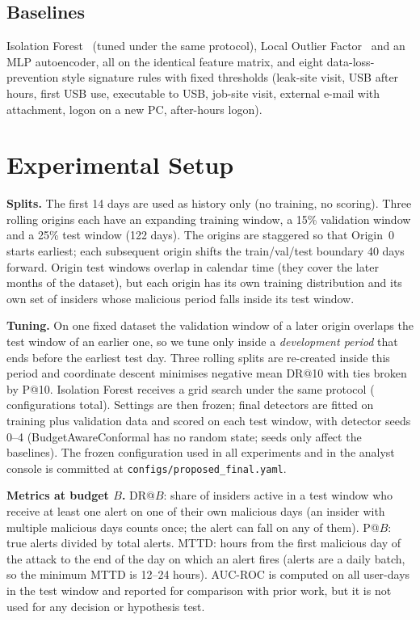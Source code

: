 \documentclass[conference]{IEEEtran}
\newcommand{\B}{\ensuremath{B}}
\begin{document}
\subsection{Baselines}
Isolation Forest~\cite{liu2008isolation} (tuned under the same protocol), Local Outlier
Factor~\cite{breunig2000lof} and an MLP autoencoder, all on the identical feature matrix, and eight
data-loss-prevention style signature rules with fixed thresholds (leak-site visit, USB after hours,
first USB use, executable to USB, job-site visit, external e-mail with attachment, logon on a new
PC, after-hours logon).

\section{Experimental Setup}
\textbf{Splits.} The first 14 days are used as history only (no training, no scoring). Three
rolling origins each have an expanding training window, a 15\% validation window and a 25\% test
window (122 days). The origins are staggered so that Origin~0 starts earliest; each subsequent
origin shifts the train/val/test boundary 40 days forward. Origin test windows overlap in calendar
time (they cover the later months of the dataset), but each origin has its own training distribution
and its own set of insiders whose malicious period falls inside its test window.

\textbf{Tuning.} On one fixed dataset the validation window of a later origin overlaps the test
window of an earlier one, so we tune only inside a \emph{development period} that ends before the
earliest test day. Three rolling splits are re-created inside this period and coordinate descent
minimises negative mean DR@10 with ties broken by P@10. Isolation Forest receives a grid search
under the same protocol (\NTuningConfigs{} configurations total). Settings are then frozen; final
detectors are fitted on training plus validation data and scored on each test window, with
detector seeds 0--4 (BudgetAwareConformal has no random state; seeds only affect the baselines).
The frozen configuration used in all experiments and in the analyst console is committed at
\texttt{configs/proposed\_final.yaml}.

\textbf{Metrics at budget \B.} DR@\B: share of insiders active in a test window who receive
at least one alert on one of their own malicious days (an insider with multiple malicious days
counts once; the alert can fall on any of them). P@\B: true alerts divided by total alerts.
MTTD: hours from the first malicious day of the attack to the end of the day on which an alert
fires (alerts are a daily batch, so the minimum MTTD is 12--24 hours). AUC-ROC is computed on
all user-days in the test window and reported for comparison with prior work, but it is not used
for any decision or hypothesis test.
\end{document}
